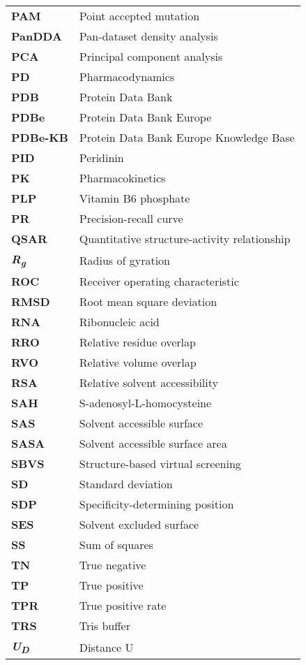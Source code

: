 \begin{longtable}[l]{@{}p{2.5cm}p{12cm}@{}}
\textbf{PAM} & Point accepted mutation \\
\textbf{PanDDA} & Pan-dataset density analysis \\
\textbf{PCA} & Principal component analysis \\
\textbf{PD} & Pharmacodynamics \\ 
\textbf{PDB} & Protein Data Bank \\
\textbf{PDBe} & Protein Data Bank Europe \\
\textbf{PDBe-KB} & Protein Data Bank Europe Knowledge Base \\
\textbf{PID} & Peridinin \\
\textbf{PK} & Pharmacokinetics \\
\textbf{PLP} & Vitamin B6 phosphate \\
\textbf{PR} & Precision-recall curve \\
\textbf{QSAR} & Quantitative structure-activity relationship \\
\textbf{\textit{R\textsubscript{g}}} & Radius of gyration \\
\textbf{ROC} & Receiver operating characteristic \\
\textbf{RMSD} & Root mean square deviation \\
\textbf{RNA} & Ribonucleic acid \\
\textbf{RRO} & Relative residue overlap \\
\textbf{RVO} & Relative volume overlap \\
\textbf{RSA} & Relative solvent accessibility \\
\textbf{SAH} & S-adenosyl-L-homocysteine \\
\textbf{SAS} & Solvent accessible surface \\
\textbf{SASA} & Solvent accessible surface area \\
\textbf{SBVS} & Structure-based virtual screening \\
\textbf{SD} & Standard deviation \\
\textbf{SDP} & Specificity-determining position \\
\textbf{SES} & Solvent excluded surface \\
\textbf{SS} & Sum of squares \\
\textbf{TN} & True negative \\
\textbf{TP} & True positive \\
\textbf{TPR} & True positive rate \\
\textbf{TRS} & Tris buffer \\
\textbf{\textit{U\textsubscript{D}}} & Distance U \\

\end{longtable}
